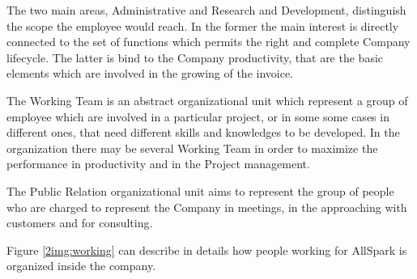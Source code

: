 The two main areas, Administrative and Research and Development, distinguish
the scope the employee would reach. In the former the main interest is
directly connected to the set of functions which permits the right and
complete Company lifecycle. The latter is bind to the Company productivity,
that are the basic elements which are involved in the growing of
the invoice.
 
The Working Team is an abstract organizational unit which represent a group
of employee which are involved in a particular project, or in some some
cases in different ones, that need different skills and knowledges to be
developed. In the organization there may be several Working Team in order to
maximize the performance in productivity and in the Project management.
 
The Public Relation organizational unit aims to represent the group of
people who are charged to represent the Company in meetings, in the
approaching with customers and for consulting.
 
Figure \ref{2img:working} can describe in details how people working for
AllSpark is organized inside the company.
 
